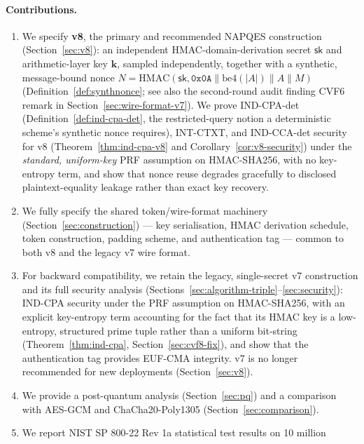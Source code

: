 \documentclass[11pt,a4paper]{article}
\begin{document}
\paragraph{Contributions.}
\begin{enumerate}
  \item We specify \textbf{v8}, the primary and recommended NAPQES
        construction (Section~\ref{sec:v8}): an independent
        HMAC-domain-derivation secret $\mathsf{sk}$ and arithmetic-layer
        key $\mathbf{k}$, sampled independently, together with a synthetic,
        message-bound nonce $N=\mathrm{HMAC}(\mathsf{sk},\texttt{0x0A}\|\mathrm{be4}(|A|)\|A\|M)$
        (Definition~\ref{def:synthnonce}; see also the second-round audit
        finding CVF6 remark in Section~\ref{sec:wire-format-v7}).
        We prove IND-CPA-det (Definition~\ref{def:ind-cpa-det}, the
        restricted-query notion a deterministic scheme's synthetic nonce
        requires), INT-CTXT, and IND-CCA-det security for v8
        (Theorem~\ref{thm:ind-cpa-v8} and Corollary~\ref{cor:v8-security})
        under the \emph{standard, uniform-key} PRF assumption on
        HMAC-SHA256, with no key-entropy term, and show that nonce reuse
        degrades gracefully to disclosed plaintext-equality leakage rather
        than exact key recovery.
  \item We fully specify the shared token/wire-format machinery
        (Section~\ref{sec:construction}) --- key serialisation, HMAC
        derivation schedule, token construction, padding scheme, and
        authentication tag --- common to both v8 and the legacy v7 wire
        format.
  \item For backward compatibility, we retain the legacy, single-secret
        v7 construction and its full security analysis
        (Sections~\ref{sec:algorithm-triple}--\ref{sec:security}): IND-CPA
        security under the PRF assumption on HMAC-SHA256, with an explicit
        key-entropy term accounting for the fact that its HMAC key is a
        low-entropy, structured prime tuple rather than a uniform
        bit-string (Theorem~\ref{thm:ind-cpa}, Section~\ref{sec:cvf8-fix}),
        and show that the authentication tag provides EUF-CMA integrity. v7
        is no longer recommended for new deployments (Section~\ref{sec:v8}).
  \item We provide a post-quantum analysis (Section~\ref{sec:pq}) and a
        comparison with AES-GCM and ChaCha20-Poly1305
        (Section~\ref{sec:comparison}).
  \item We report NIST SP 800-22 Rev 1a statistical test results on 10 million

\end{enumerate}
\end{document}
